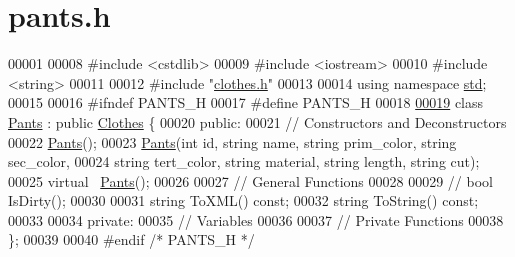 \hypertarget{pants_8h_source}{}\section{pants.\+h}

\begin{DoxyCode}
00001 
00008 \textcolor{preprocessor}{#include <cstdlib>}
00009 \textcolor{preprocessor}{#include <iostream>}
00010 \textcolor{preprocessor}{#include <string>}
00011 
00012 \textcolor{preprocessor}{#include "\mbox{\hyperlink{clothes_8h}{clothes.h}}"}
00013 
00014 \textcolor{keyword}{using namespace }\mbox{\hyperlink{namespacestd}{std}};
00015 
00016 \textcolor{preprocessor}{#ifndef PANTS\_H}
00017 \textcolor{preprocessor}{#define PANTS\_H}
00018 
\mbox{\hyperlink{classPants}{00019}} \textcolor{keyword}{class }\mbox{\hyperlink{classPants}{Pants}} : \textcolor{keyword}{public} \mbox{\hyperlink{classClothes}{Clothes}} \{
00020  \textcolor{keyword}{public}:
00021   \textcolor{comment}{// Constructors and Deconstructors}
00022   \mbox{\hyperlink{classPants}{Pants}}();
00023   \mbox{\hyperlink{classPants}{Pants}}(\textcolor{keywordtype}{int} \textcolor{keywordtype}{id}, \textcolor{keywordtype}{string} name, \textcolor{keywordtype}{string} prim\_color, \textcolor{keywordtype}{string} sec\_color,
00024         \textcolor{keywordtype}{string} tert\_color, \textcolor{keywordtype}{string} material, \textcolor{keywordtype}{string} length, \textcolor{keywordtype}{string} cut);
00025   \textcolor{keyword}{virtual} ~\mbox{\hyperlink{classPants}{Pants}}();
00026 
00027   \textcolor{comment}{// General Functions}
00028 
00029   \textcolor{comment}{// bool IsDirty();}
00030 
00031   \textcolor{keywordtype}{string} ToXML() \textcolor{keyword}{const};
00032   \textcolor{keywordtype}{string} ToString() \textcolor{keyword}{const};
00033 
00034  \textcolor{keyword}{private}:
00035   \textcolor{comment}{// Variables}
00036 
00037   \textcolor{comment}{// Private Functions}
00038 \};
00039 
00040 \textcolor{preprocessor}{#endif }\textcolor{comment}{/* PANTS\_H */}\textcolor{preprocessor}{}
\end{DoxyCode}
